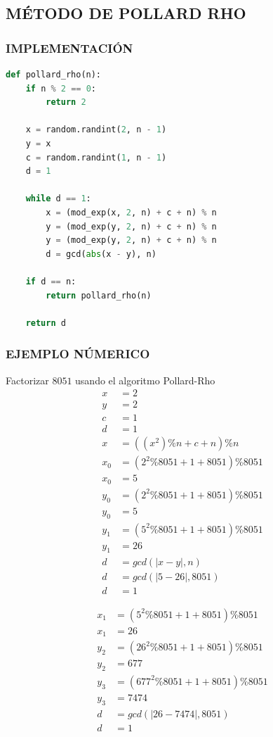\subsection{MÉTODO DE POLLARD RHO}
\subsubsection{IMPLEMENTACIÓN}
\begin{lstlisting}[language=Python]
def pollard_rho(n):
    if n % 2 == 0:
        return 2

    x = random.randint(2, n - 1)
    y = x
    c = random.randint(1, n - 1)
    d = 1

    while d == 1:
        x = (mod_exp(x, 2, n) + c + n) % n
        y = (mod_exp(y, 2, n) + c + n) % n
        y = (mod_exp(y, 2, n) + c + n) % n
        d = gcd(abs(x - y), n)

    if d == n:
        return pollard_rho(n)

    return d
\end{lstlisting}

\subsubsection{EJEMPLO NÚMERICO}
    Factorizar $8051$ usando el algoritmo Pollard-Rho
    \begin{align*} 
        x &=  2\\
        y &=  2\\
        c &=  1\\ 
        d &= 1 \\
        x &= ((x^2)\%n + c + n)\%n\\
        x_0 &= (2^2\%8051 + 1 + 8051) \% 8051\\
        x_0 &= 5\\
        y_0 &= (2^2\%8051 + 1 + 8051) \% 8051\\
        y_0 &= 5\\
        y_1 &= (5^2\%8051 + 1 + 8051) \% 8051\\
        y_1 &= 26\\
        d &= gcd(|x-y|, n)\\
        d &= gcd(|5-26|, 8051)\\
        d &= 1
    \end{align*}

    \begin{align*} 
        x_1 &= (5^2\%8051 + 1 + 8051) \% 8051\\
        x_1 &= 26\\
        y_2 &= (26^2\%8051 + 1 + 8051) \% 8051\\
        y_2 &= 677\\
        y_3 &= (677^2\%8051 + 1 + 8051) \% 8051\\
        y_3 &= 7474\\
        d &= gcd(|26-7474|, 8051)\\
        d &= 1
    \end{align*}

